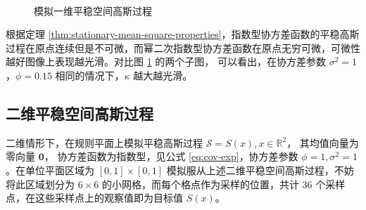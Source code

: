 \documentclass[12pt,a4paper,UTF8,twoside]{book}
\theoremstyle{definition}
\theoremstyle{definition}
\theoremstyle{definition}
\theoremstyle{remark}
\begin{document}
\begin{figure}[!htb]

{\centering {}\\

}

\caption{模拟一维平稳空间高斯过程}\label{fig:one-dim-gp}
\end{figure}

根据定理 \ref{thm:stationary-mean-square-properties}，指数型协方差函数的平稳高斯过程在原点连续但是不可微，而幂二次指数型协方差函数在原点无穷可微，可微性越好图像上表现越光滑。对比图 \ref{fig:one-dim-gp} 的两个子图， 可以看出，在协方差参数 \(\sigma^2 = 1\)，\(\phi = 0.15\) 相同的情况下，\(\kappa\) 越大越光滑。

\hypertarget{sim-two-gp}{%
\subsection{二维平稳空间高斯过程}\label{sim-two-gp}}

二维情形下，在规则平面上模拟平稳高斯过程 \(\mathcal{S} = S(x), x \in \mathbb{R}^2\)， 其均值向量为零向量 \(\mathbf{0}\)， 协方差函数为指数型，见公式 \eqref{eq:cov-exp}，协方差参数 \(\phi = 1, \sigma^2 = 1\)。在单位平面区域为 \([0,1] \times [0,1]\) 模拟服从上述二维平稳空间高斯过程，不妨将此区域划分为 \(6 \times 6\) 的小网格，而每个格点作为采样的位置，共计 36 个采样点，在这些采样点上的观察值即为目标值 \(S(x)\)。
\end{document}

